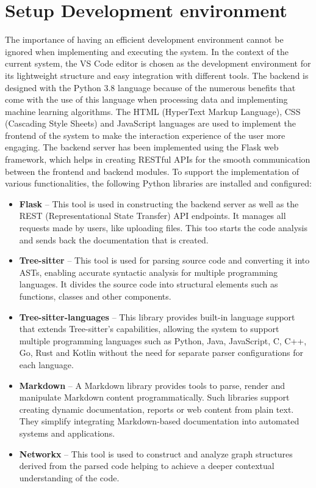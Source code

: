 \section{Setup Development environment}
\hspace{0.5cm}The importance of having an efficient development environment cannot be ignored when implementing and executing the system. In the context of the current system, the VS Code editor is chosen as the development environment for its lightweight structure and easy integration with different tools. The backend is designed with the Python 3.8 language because of the numerous benefits that come with the use of this language when processing data and implementing machine learning algorithms. The HTML (HyperText Markup Language), CSS (Cascading Style Sheets) and JavaScript languages are used to implement the frontend of the system to make the interaction experience of the user more engaging. The backend server has been implemented using the Flask web framework, which helps in creating RESTful APIs for the smooth communication between the frontend and backend modules.
To support the implementation of various functionalities, the following Python libraries are installed and configured:\begin{itemize}
\item \textbf{Flask} -- This tool is used in constructing the backend server as well as the REST (Representational State Transfer) API endpoints. It manages all requests made by users, like uploading files. This too starts the code analysis and sends back the documentation that is created.

\item \textbf{Tree-sitter} -- This tool is used for parsing source code and converting it into ASTs, enabling accurate syntactic analysis for multiple programming languages. It divides the source code into structural elements such as functions, classes and other components.

\item \textbf{Tree-sitter-languages} -- This library provides built-in language support that extends Tree-sitter’s capabilities, allowing the system to support multiple programming languages such as Python, Java, JavaScript, C, C++, Go, Rust and Kotlin without the need for separate parser configurations for each language.

\item \textbf{Markdown} -- A Markdown library provides tools to parse, render and manipulate Markdown content programmatically.  
Such libraries support creating dynamic documentation, reports or web content from plain text. 
They simplify integrating Markdown-based documentation into automated systems and applications.

\item \textbf{Networkx} -- This tool is used to construct and analyze graph structures derived from the parsed code helping to achieve a deeper contextual understanding of the code.
\end{itemize}
